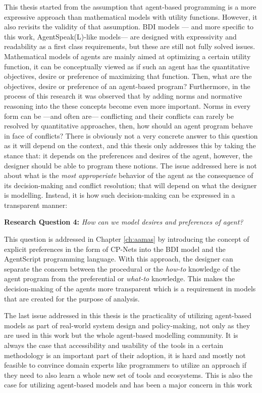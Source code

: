 This thesis started from the assumption that agent-based programming is a more expressive approach than mathematical models with utility functions. However, it also revisits the validity of that assumption. BDI models --- and more specific to this work, AgentSpeak(L)-like models--- are designed with expressivity and readability as a first class requirements, but these are still not fully solved issues. Mathematical models of agents are mainly aimed at optimizing a certain utility function, it can be conceptually viewed as if such an agent has the quantitative objectives, desire or preference of maximizing that function. Then, what are the objectives, desire or preference of an agent-based program? Furthermore, in the process of this research it was observed that by adding norms and normative reasoning into the these concepts become even more important. Norms in every form can be ---and often are--- conflicting and their conflicts can rarely be resolved by quantitative approaches, then, how should an agent program behave in face of conflicts? There is obviously not a very concrete answer to this question as it will depend on the context, and this thesis only addresses this by taking the stance that:  it depends on the preferences and desires of the agent, however, the designer should be able to program these notions. The issue addressed here is not about what is the \textit{most approperiate} behavior of the agent as the consequence of its decision-making and conflict resolution; that will depend on what the designer is modelling. Instead, it is how such decision-making can be expressed in a transparent manner:

\textbf{Research Question 4:} \textit{How can we model desires and preferences of agent?}

This question is addressed in Chapter \ref{ch:aamas} by introducing the concept of explicit preferences in the form of CP-Nets into the BDI model and the AgentScript programming language. With this approach, the designer can separate the concern between the procedural or the \textit{how-to} knowledge of the agent program from the preferential or \textit{what-to} knowledge. This makes the decision-making of the agents more transparent which is a requirement in models that are created for the purpose of analysis. 

The last issue addressed in this thesis is the practicality of utilizing agent-based models as part of real-world system design and policy-making, not only as they are used in this work but the whole agent-based modelling community. It is always the case that accessibility and usability of the tools in a certain methodology is an important part of their adoption, it is hard and mostly not feasible to convince domain experts like programmers to utilize an approach if they need to also learn a whole new set of tools and ecosystems. This is also the case for utilizing agent-based models and has been a major concern in this work

